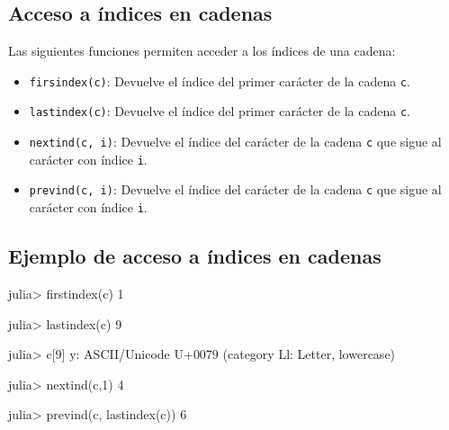 \documentclass[
  letterpaper,
  DIV=11,
  numbers=noendperiod]{scrreprt}
\newenvironment{Shaded}{\begin{snugshade}}{\end{snugshade}}
\newcommand{\BuiltInTok}[1]{\textcolor[rgb]{0.00,0.23,0.31}{#1}}
\newcommand{\CharTok}[1]{\textcolor[rgb]{0.13,0.47,0.30}{#1}}
\newcommand{\FloatTok}[1]{\textcolor[rgb]{0.68,0.00,0.00}{#1}}
\newcommand{\FunctionTok}[1]{\textcolor[rgb]{0.28,0.35,0.67}{#1}}
\newcommand{\NormalTok}[1]{\textcolor[rgb]{0.00,0.23,0.31}{#1}}
\newcommand{\OperatorTok}[1]{\textcolor[rgb]{0.37,0.37,0.37}{#1}}
\providecommand{\tightlist}{%
  \setlength{\itemsep}{0pt}\setlength{\parskip}{0pt}}\usepackage{longtable,booktabs,array}
\begin{document}
\hypertarget{acceso-a-uxedndices-en-cadenas}{%
\subsection{Acceso a índices en
cadenas}\label{acceso-a-uxedndices-en-cadenas}}

Las siguientes funciones permiten acceder a los índices de una cadena:

\begin{itemize}
\tightlist
\item
  \texttt{firsindex(c)}: Devuelve el índice del primer carácter de la
  cadena \texttt{c}.
\item
  \texttt{lastindex(c)}: Devuelve el índice del primer carácter de la
  cadena \texttt{c}.
\item
  \texttt{nextind(c,\ i)}: Devuelve el índice del carácter de la cadena
  \texttt{c} que sigue al carácter con índice \texttt{i}.
\item
  \texttt{prevind(c,\ i)}: Devuelve el índice del carácter de la cadena
  \texttt{c} que sigue al carácter con índice \texttt{i}.
\end{itemize}

\hypertarget{ejemplo-de-acceso-a-uxedndices-en-cadenas}{%
\subsection{Ejemplo de acceso a índices en
cadenas}\label{ejemplo-de-acceso-a-uxedndices-en-cadenas}}

\begin{Shaded}
\begin{Highlighting}[]
\NormalTok{julia}\OperatorTok{\textgreater{}} \FunctionTok{firstindex}\NormalTok{(c)}
\FloatTok{1}

\NormalTok{julia}\OperatorTok{\textgreater{}} \FunctionTok{lastindex}\NormalTok{(c)}
\FloatTok{9}

\NormalTok{julia}\OperatorTok{\textgreater{}}\NormalTok{ c[}\FloatTok{9}\NormalTok{]}
\CharTok{\textquotesingle{}y\textquotesingle{}}\OperatorTok{:}\NormalTok{ ASCII}\OperatorTok{/}\BuiltInTok{Unicode}\NormalTok{ U}\OperatorTok{+}\FloatTok{0079}\NormalTok{ (category Ll}\OperatorTok{:}\NormalTok{ Letter, lowercase)}

\NormalTok{julia}\OperatorTok{\textgreater{}} \FunctionTok{nextind}\NormalTok{(c,}\FloatTok{1}\NormalTok{)}
\FloatTok{4}

\NormalTok{julia}\OperatorTok{\textgreater{}} \FunctionTok{prevind}\NormalTok{(c, }\FunctionTok{lastindex}\NormalTok{(c))}
\FloatTok{6}
\end{Highlighting}
\end{Shaded}
\end{document}
